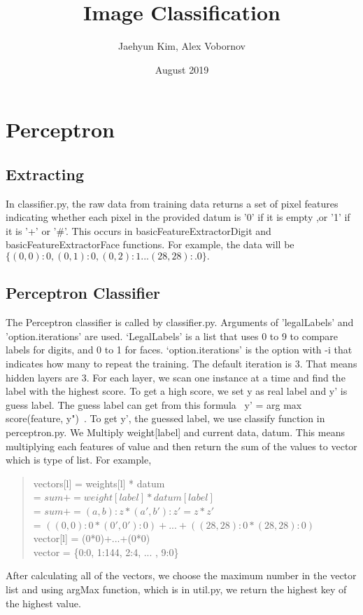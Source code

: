 \documentclass{article}
\title{Image Classification}
\author{Jaehyun Kim, Alex Vobornov}
\date{August 2019}
\begin{document}
\maketitle

\section{Perceptron}
    \subsection{Extracting}
        \hspace*{10mm}In classifier.py, the raw data from training data returns a set of pixel features indicating whether each pixel in the provided datum is '0' if it is empty ,or '1' if it is '+' or '\#'. This occurs in basicFeatureExtractorDigit and basicFeatureExtractorFace functions. For example, the data will be $\{(0,0):0,(0,1):0,(0,2):1...(28,28):.0\}.$ 
   
    \subsection{Perceptron Classifier}
        \hspace*{10mm}The Perceptron classifier is called by classifier.py. Arguments of 'legalLabels' and 'option.iterations' are used. ‘LegalLabels’ is a list that uses 0 to 9 to compare labels for digits, and 0 to 1 for faces. ‘option.iterations’ is the option with -i that indicates how many to repeat the training. The default iteration is 3. That means hidden layers are 3. \newline
        For each layer, we scan one instance at a time and find the label with the highest score. To get a high score, we set y as real label and y' is guess label. The guess label can get from this formula \ y' = arg max score(feature, y")\ . \newline
        To get y', the guessed label, we use classify function in perceptron.py. We Multiply weight[label] and current data, datum. This means multiplying each features of value and then return the sum of the values to vector which is type of list. 
        For example,  
        \begin{quote}
            vectors[l] = weights[l] * datum\\
            = $sum += weight[label] * datum[label]$\\
            = $sum += (a,b):z * (a',b'):z' = z * z'$\\
            = $((0,0):0 * (0',0'):0)+...+((28,28):0 * (28,28):0)$\\
            vector[l] = (0*0)+...+(0*0)\\
            vector = \{0:0, 1:144, 2:4, ... , 9:0\}
        \end{quote}
        After calculating all of the vectors, we choose the maximum number in the vector list and using argMax function, which is in util.py, we return the highest key of the highest value.
        
\end{document}
